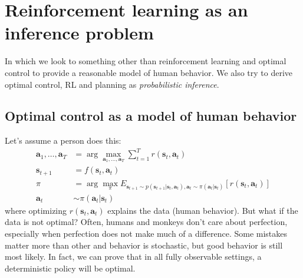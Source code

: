 \documentclass{report}
\newcommand{\argmax}{\arg\!\max}
\begin{document}
\chapter{Reinforcement learning as an inference problem}
In which we look to something other than reinforcement learning and optimal control to
provide a reasonable model of human behavior.
We also try to derive optimal control, RL and planning as \textit{probabilistic inference}.

\section{Optimal control as a model of human behavior}
Let's assume a person does this:
\begin{align}
\bm{a}_{1}, \dots, \bm{a}_{T} &= \argmax_{\bm{a}_{1}, \dots, \bm{a}_{T}} \sum_{t=1}^{T} r (\bm{s}_{t}, \bm{a}_{t} ) \\
\bm{s}_{t+1} &= f (\bm{s}_{t}, \bm{a}_{t} ) \\
\pi &= \argmax_{\pi} E_{ \bm{s}_{t+1} \sim p (\bm{s}_{t+1} | \bm{s}_{t}, \bm{a}_{t}), \bm{a}_{t} \sim \pi (\bm{a}_{t}| \bm{s}_{t} ) } \left[ r (\bm{s}_{t}, \bm{a}_{t} ) \right] \\
\bm{a}_{t} &\sim \pi (\bm{a}_{t}| \bm{s}_{t} )
\end{align}
where optimizing $ r (\bm{s}_{t}, \bm{a}_{t} )  $ explains the data  (human behavior).
But what if the data is not optimal? 
Often, humans and monkeys don't care about perfection, especially when perfection does not make
much of a difference.
Some mistakes matter more than other and behavior is stochastic, but good behavior is still most likely.
In fact, we can prove that in all fully observable settings, a deterministic policy will be optimal.
\end{document}
